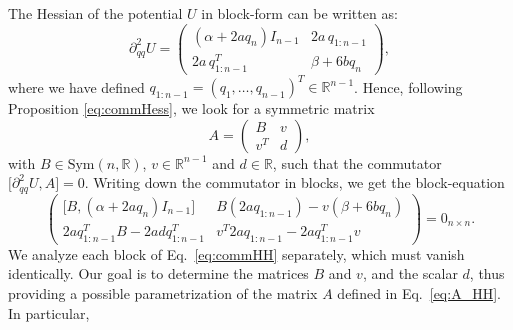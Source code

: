 \documentclass{rendiconti}
\begin{document}
The Hessian of the potential $U$ in block-form can be written as:
\begin{equation}
\label{eq:HessHH}
\partial^2_{qq}U = 
\begin{pmatrix}
(\alpha + 2 a q_n) I_{n-1} & 2 a \, q_{1:n-1} \\
2 a \, q_{1:n-1}^T & \beta + 6 b q_n
\end{pmatrix},
\end{equation}
where we have defined $q_{1:n-1} = (q_1, \dots, q_{n-1})^T\in \mathbb{R}^{n-1}$. Hence, following Proposition \ref{eq:commHess}, we look for a symmetric matrix
\begin{equation}
\label{eq:A_HH}
A = \begin{pmatrix} B & v \\ v^T & d \end{pmatrix},
\end{equation}
with $B \in \mathrm{Sym}(n,\mathbb{R})$, $v \in \mathbb{R}^{n-1}$ and $d \in \mathbb{R}$,
such that the commutator $\big[\partial^2_{qq}U,A\big]=0$. 
Writing down the commutator in blocks, we get the block-equation
\begin{equation}
\label{eq:commHH}
\begin{pmatrix}
\big[B, (\alpha + 2 a q_n) I_{n-1}\big] & B(2 a q_{1:n-1}) - v (\beta + 6 b q_n) \\
2 a q_{1:n-1}^T B - 2 a d q_{1:n-1}^T & v^T 2 a q_{1:n-1} - 2 a q^T_{1:n-1} v
\end{pmatrix} = 0_{n\times n}.
\end{equation}
We analyze each block of Eq.~\eqref{eq:commHH} separately, which must vanish identically. Our goal is to determine the matrices $B$ and $v$, and the scalar $d$, thus providing a possible parametrization of the matrix $A$ defined in Eq.~\eqref{eq:A_HH}. In particular,
\end{document}
